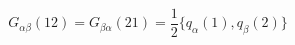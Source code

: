 \begin{equation}                      
G_{\alpha \beta}(12) = G_{\beta \alpha}(21) =                       
\frac{1}{2}  \{q_{\alpha}(1), q_{\beta}(2)\}                      
\end{equation} 
